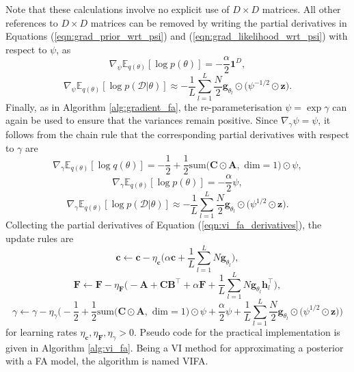 \documentclass[msc,deptreport.inf]{infthesis} %
\newcommand{\matr}[1]{\mathbf{#1}}
\newcommand{\E}{\mathbb E}
\begin{document}
Note that these calculations involve no explicit use of $D \times D$ matrices. All other references to $D \times D$ matrices can be removed by writing the partial derivatives in Equations (\ref{eqn:grad_prior_wrt_psi}) and (\ref{eqn:grad_likelihood_wrt_psi}) with respect to $\psi$, as
\begin{equation}
	\nabla_\psi \E_{q(\theta)} [\log p(\theta)] = -\frac{\alpha}{2} \matr{1}^D,
\end{equation}
\begin{equation}
	\nabla_\psi \E_{q(\theta)} [\log p(\mathcal{D} | \theta)]
	 \approx  -\frac{1}{L} \sum_{l=1}^{L} \frac{N}{2} \matr{g}_{\theta_l} \odot \big(\psi^{-1/2} \odot \matr{z} \big).
\end{equation}
Finally, as in Algorithm \ref{alg:gradient_fa}, the re-parameterisation $\psi = \exp \gamma$ can again be used to ensure that the variances remain positive. Since $\nabla_\gamma \psi = \psi$, it follows from the chain rule that the corresponding partial derivatives with respect to $\gamma$ are 
\begin{equation}
	\nabla_\gamma \E_{q(\theta)} [\log q(\theta)] = -\frac{1}{2} + \frac{1}{2} \text{sum}\big(\matr{C} \odot \matr{A}, \text{ dim} = 1\big) \odot \psi,
\end{equation}
\begin{equation}
	\nabla_\gamma \E_{q(\theta)} [\log p(\theta)] = -\frac{\alpha}{2} \psi,
\end{equation}
\begin{equation}
	\nabla_\gamma \E_{q(\theta)} [\log p(\mathcal{D} | \theta)]
	 \approx  -\frac{1}{L} \sum_{l=1}^{L} \frac{N}{2} \matr{g}_{\theta_l} \odot \big(\psi^{1/2} \odot \matr{z} \big).
\end{equation}
Collecting the partial derivatives of Equation (\ref{eqn:vi_fa_derivatives}), the update rules are
 \begin{equation}\label{eqn:vifa_c_update}
	\matr{c} \leftarrow \matr{c} - \eta_\matr{c}\Bigg(
	\alpha \matr{c} + \frac{1}{L} \sum_{l=1}^{L} N \matr{g}_{\theta_l}
	\Bigg),
\end{equation}
 \begin{equation}\label{eqn:vifa_F_update}
	\matr{F} \leftarrow \matr{F} - \eta_\matr{F}\Bigg(
	-\matr{A}  + \matr{C} \matr{B}^\intercal+ \alpha \matr{F} + \frac{1}{L} \sum_{l=1}^{L} N \matr{g}_{\theta_l} \matr{h}_l^\intercal
	\Bigg),
\end{equation}
\begin{equation}\label{eqn:vifa_gamma_update}
	\gamma \leftarrow \gamma - \eta_\gamma\Bigg(
	-\frac{1}{2} + \frac{1}{2} \text{sum}\big(\matr{C} \odot \matr{A}, \text{ dim} = 1\big) \odot \psi
	+\frac{\alpha}{2} \psi + \frac{1}{L} \sum_{l=1}^{L} \frac{N}{2} \matr{g}_{\theta_l} \odot \big(\psi^{1/2} \odot \matr{z} \big)
	\Bigg)
\end{equation}
for learning rates $\eta_\matr{c},  \eta_\matr{F}, \eta_\gamma > 0$. Pseudo code for the practical implementation is given in Algorithm \ref{alg:vi_fa}. Being a VI method for approximating a posterior with a FA model, the algorithm is named VIFA.
\end{document}
